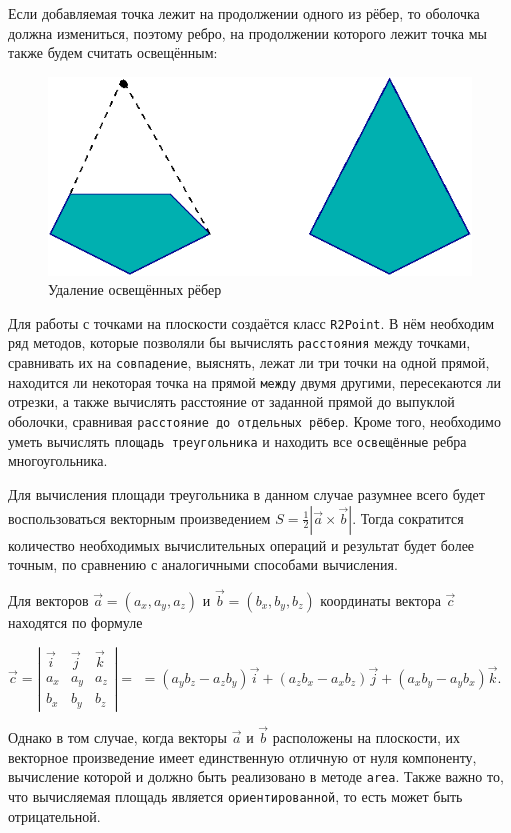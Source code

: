 Если добавляемая точка лежит на продолжении одного из рёбер,
 то оболочка должна измениться, поэтому ребро, на продолжении которого лежит
  точка мы также будем считать освещённым:

\begin{figure}[ht!]
\begin{center}
\includegraphics[width=0.4\hsize]{images/conv_3}
\end{center}
\caption{Удаление освещённых рёбер}\label{fig:conv_3}
\end{figure}

Для работы с точками на плоскости создаётся класс \verb|R2Point|. В нём необходим ряд
методов, которые позволяли бы вычислять \verb|расстояния| между точками,
сравнивать их на \verb|совпадение|, выяснять, лежат ли три точки на одной
прямой, находится ли некоторая точка на прямой \verb|между| двумя другими,
пересекаются ли отрезки, а также вычислять расстояние от заданной
прямой до выпуклой оболочки, сравнивая \verb|расстояние до отдельных рёбер|.
Кроме того, необходимо уметь вычислять \verb|площадь треугольника| и находить
все \verb|освещённые| ребра многоугольника.

Для вычисления площади треугольника в данном случае разумнее всего будет
воспользоваться векторным произведением $S = \frac{1}{2} |\vec a \times \vec b|$.
Тогда сократится количество необходимых вычислительных операций и результат будет более точным,
по сравнению с аналогичными способами вычисления.

Для векторов  $\vec a = (a_x, a_y, a_z)$ и $\vec b = (b_x, b_y, b_z)$  координаты вектора
 $\vec c$ находятся по формуле \\
\begin{center}
$\vec c = \left| \begin{array}{ccc} \vec i& \vec j& \vec k\\ a_x & a_y & a_z \\ b_x & b_y & b_z \end{array} \right| =$ $= (a_y b_z - a_z b_y) \vec i + (a_z b_x - a_x b_z) \vec j + (a_x b_y - a_y b_x) \vec k$.
\end{center}
Однако в том случае, когда векторы $\vec a$ и $\vec b$ расположены на плоскости,
их векторное произведение имеет единственную отличную от нуля компоненту,
вычисление которой и должно быть реализовано в методе \verb|area|.
Также важно то, что вычисляемая площадь является \verb|ориентированной|,
то есть может быть отрицательной.

